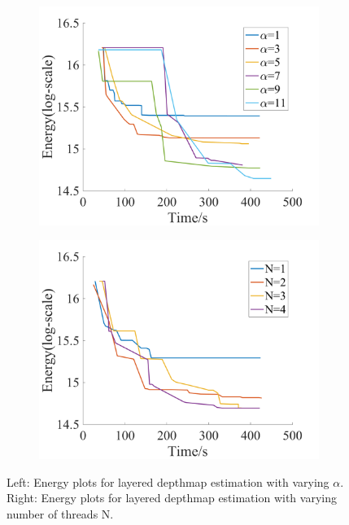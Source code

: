 \begin{figure}[!h]
  \centering
  \begin{subfigure}[b]{0.49\columnwidth}
    \centering
    \includegraphics[width=\columnwidth]{figure/layered_depthmap_by_alpha.png}
  \end{subfigure}  
  \begin{subfigure}[b]{0.49\columnwidth}
    \centering
    \includegraphics[width=\columnwidth]{figure/layered_depthmap_by_N.png}
  \end{subfigure}
  \caption{Left: Energy plots for layered depthmap estimation with varying
    $\alpha$. Right: Energy plots for layered depthmap estimation with varying number of threads N.}
  \label{fig:layered_depthmap_configuration}
\end{figure}


